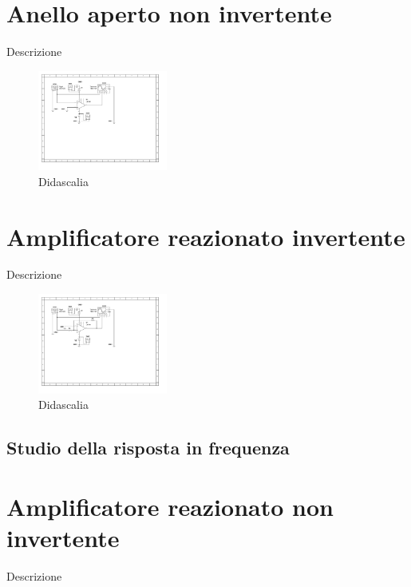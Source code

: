 \documentclass[journal]{IEEEtran}
\begin{document}
\section{\textbf{Anello aperto non invertente}} %
Descrizione

\begin{figure}[H]%
\begin {center}
\includegraphics[width=0.38\textwidth]{sch-simulations/output/OPA-open-loop-non-inverting.pdf}
\caption{Didascalia}
\label{fig:oscilloscope}
\end {center}
\end{figure}


\section{\textbf{Amplificatore reazionato invertente}} %
Descrizione

\begin{figure}[H]%
\begin {center}
\includegraphics[width=0.38\textwidth]{sch-simulations/output/OPA-closed-loop-inverting.pdf}
\caption{Didascalia}
\label{fig:oscilloscope}
\end {center}
\end{figure}

\subsection{Studio della risposta in frequenza}


\section{\textbf{Amplificatore reazionato non invertente}} %
Descrizione
\end{document}
